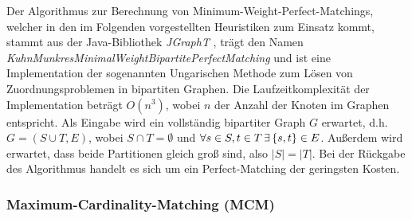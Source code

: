 Der Algorithmus zur Berechnung von Minimum-Weight-Perfect-Matchings, welcher in den im Folgenden
vorgestellten Heuristiken zum Einsatz kommt, stammt aus der Java-Bibliothek \textit{JGraphT} \cite{JGraphT}, trägt
den Namen \textit{KuhnMunkresMinimalWeightBipartitePerfectMatching} und ist eine Implementation der
sogenannten Ungarischen Methode zum Lösen von Zuordnungsproblemen in bipartiten Graphen.
Die Laufzeitkomplexität der Implementation beträgt $O(n^3)$, wobei $n$ der Anzahl der Knoten im Graphen entspricht.
Als Eingabe wird ein vollständig bipartiter Graph $G$ erwartet, d.h. $G= (S \cup T, E)$, wobei $S \cap T = \emptyset$ und
$\forall s \in S, t \in T \thinspace \exists \thinspace \{s, t\} \in E$. Außerdem wird erwartet, dass beide Partitionen gleich groß sind,
also $|S| = |T|$. Bei der Rückgabe des Algorithmus handelt es sich um ein Perfect-Matching der geringsten Kosten.

\subsubsection{Maximum-Cardinality-Matching (MCM)}
\label{sec:digression_mcm}

